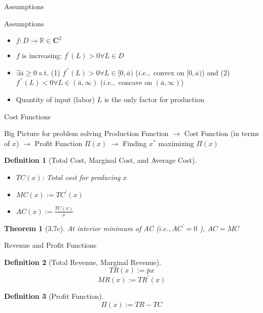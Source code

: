 \documentclass[final]{beamer}
\newtheorem{defn}{Definition}
\newtheorem{thm}{Theorem}
\begin{document}
\begin{frame}[t]{Assumptions}
	\begin{block}
		{Assumptions}
		\begin{itemize}
			\item $f:D\rightarrow\mathbb{R}\in \mathbf{C}^2$
			\item $f$ is increasing: $f^\prime(L) >0 \forall L\in D$
			\item $\exists \bar a\ge 0$ s.t. (1) $f^{\prime\prime}(L)>0 \forall L\in[0,\bar a)$ ($i.e.,$ convex on $[0,\bar a)$) and (2) $f^{\prime\prime}(L)<0 \forall L\in(\bar a,\infty)$ ($i.e.,$ concave on $(\bar a,\infty)$)
			\item Quantity of input (labor) $L$ is the only factor for production
		\end{itemize}
	\end{block}

\end{frame}


\begin{frame}[t]{Cost Functions}
	\begin{block}
		{Big Picture for problem solving}
		Production Function $\rightarrow$ Cost Function (in terms of $x$) $\rightarrow$ Profit Function $\Pi(x)$ $\rightarrow$ Finding $x^\ast$ maximizing $\Pi(x)$
	\end{block}
	
	\begin{defn}
		[Total Cost, Marginal Cost, and Average Cost]
		\begin{itemize}
			\item $TC(x)$: Total cost for producing $x$
			\item $MC(x):= TC^\prime(x)$
			\item $AC(x):= \frac{TC(x)}{x}$
		\end{itemize}
	\end{defn}
	
	\begin{thm}
		[3.7c]
		At interior minimum of AC ($i.e.,AC^\prime=0$ ), $AC=MC$
	\end{thm}
\end{frame}

\begin{frame}[t]{Revenue and Profit Functions}
	\begin{defn}
		[Total Revenue, Marginal Revenue]
		\[
			TR(x) := \bar p x
		\]
		\[
			MR(x) := TR^\prime (x)
		\]
	\end{defn}
	\begin{defn}
		[Profit Function]
		\[
			\Pi(x) := TR-TC
		\]
	\end{defn}
\end{frame}
\end{document}
